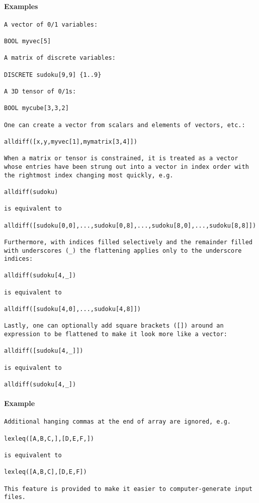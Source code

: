 \paragraph{Examples}
{\footnotesize
\begin{verbatim}
A vector of 0/1 variables:

BOOL myvec[5]

A matrix of discrete variables:

DISCRETE sudoku[9,9] {1..9}

A 3D tensor of 0/1s:

BOOL mycube[3,3,2]

One can create a vector from scalars and elements of vectors, etc.:

alldiff([x,y,myvec[1],mymatrix[3,4]])

When a matrix or tensor is constrained, it is treated as a vector
whose entries have been strung out into a vector in index order with
the rightmost index changing most quickly, e.g.

alldiff(sudoku)

is equivalent to

alldiff([sudoku[0,0],...,sudoku[0,8],...,sudoku[8,0],...,sudoku[8,8]])

Furthermore, with indices filled selectively and the remainder filled
with underscores (_) the flattening applies only to the underscore
indices:

alldiff(sudoku[4,_])

is equivalent to

alldiff([sudoku[4,0],...,sudoku[4,8]])

Lastly, one can optionally add square brackets ([]) around an
expression to be flattened to make it look more like a vector:

alldiff([sudoku[4,_]])

is equivalent to

alldiff(sudoku[4,_])
\end{verbatim}
}
\paragraph{Example}
{\footnotesize
\begin{verbatim}
Additional hanging commas at the end of array are ignored, e.g.

lexleq([A,B,C,],[D,E,F,])

is equivalent to 

lexleq([A,B,C],[D,E,F])

This feature is provided to make it easier to computer-generate input
files.
\end{verbatim}
}
